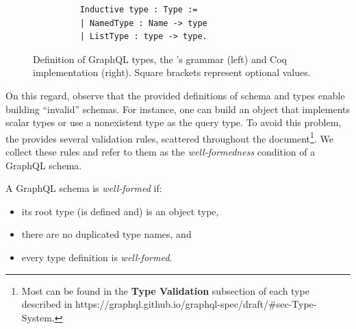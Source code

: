 \begin{figure}[h]
\begin{subfigure}{.5\textwidth}
\begin{verbatim}
    Inductive type : Type :=
    | NamedType : Name -> type
    | ListType : type -> type.
    \end{verbatim}

    \end{subfigure}
    \caption{Definition of GraphQL types, the \spec{}'s grammar (left) and Coq implementation (right). Square brackets represent optional values. }
    \label{fig:types_def}
\end{figure}




On this regard, observe that the provided definitions of schema and types enable building ``invalid'' schemas. For instance, one can build an object that implements scalar types or use a nonexistent type as the query type. To avoid this problem, the \spec provides several validation rules, scattered throughout the document\footnote{Most can be found in the \textbf{Type Validation} subsection of each type described in https://graphql.github.io/graphql-spec/draft/\#sec-Type-System.}.  We collect these rules and refer to them as the \textit{well-formedness} condition of a GraphQL schema.


\begin{definition}
A GraphQL schema is \textit{well-formed} if: 
\begin{itemize}
    \item its root type (is defined and) is an object type, 
    \item there are no duplicated type names, and
    \item every type definition is \textit{well-formed}.
\end{itemize}
\end{definition}

